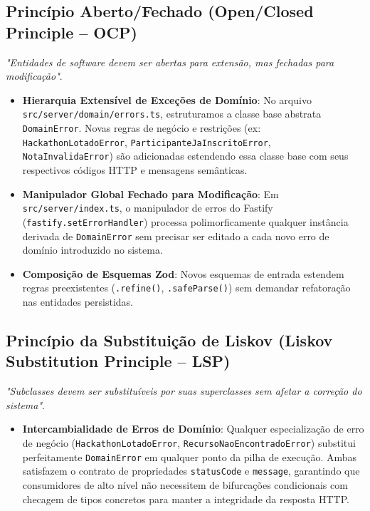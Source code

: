 \documentclass[12pt]{article}
\begin{document}
\subsection{Princípio Aberto/Fechado (Open/Closed Principle -- OCP)}
\textit{"Entidades de software devem ser abertas para extensão, mas fechadas para modificação"}.
\begin{itemize}
    \item \textbf{Hierarquia Extensível de Exceções de Domínio}: No arquivo \texttt{src/server/domain/errors.ts}, estruturamos a classe base abstrata \texttt{DomainError}. Novas regras de negócio e restrições (ex: \texttt{HackathonLotadoError}, \texttt{ParticipanteJaInscritoError}, \texttt{NotaInvalidaError}) são adicionadas estendendo essa classe base com seus respectivos códigos HTTP e mensagens semânticas.
    \item \textbf{Manipulador Global Fechado para Modificação}: Em \texttt{src/server/index.ts}, o manipulador de erros do Fastify (\texttt{fastify.setErrorHandler}) processa polimorficamente qualquer instância derivada de \texttt{DomainError} sem precisar ser editado a cada novo erro de domínio introduzido no sistema.
    \item \textbf{Composição de Esquemas Zod}: Novos esquemas de entrada estendem regras preexistentes (\texttt{.refine()}, \texttt{.safeParse()}) sem demandar refatoração nas entidades persistidas.
\end{itemize}

\subsection{Princípio da Substituição de Liskov (Liskov Substitution Principle -- LSP)}
\textit{"Subclasses devem ser substituíveis por suas superclasses sem afetar a correção do sistema"}.
\begin{itemize}
    \item \textbf{Intercambialidade de Erros de Domínio}: Qualquer especialização de erro de negócio (\texttt{HackathonLotadoError}, \texttt{RecursoNaoEncontradoError}) substitui perfeitamente \texttt{DomainError} em qualquer ponto da pilha de execução. Ambas satisfazem o contrato de propriedades \texttt{statusCode} e \texttt{message}, garantindo que consumidores de alto nível não necessitem de bifurcações condicionais com checagem de tipos concretos para manter a integridade da resposta HTTP.
\end{itemize}
\end{document}
